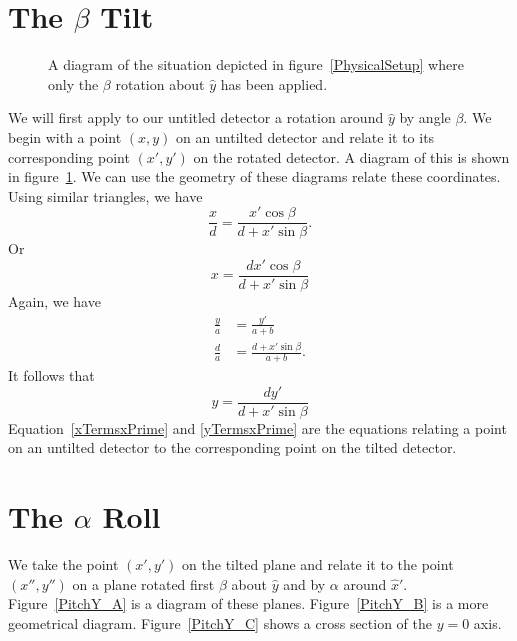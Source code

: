 \section{\texorpdfstring{The $\beta$ Tilt}{The beta Tilt}}

\begin{figure}[htb]
    \centering
    \subfloat[]{\label{PitchX_A}} 
    \hfill
    \subfloat[]{
    \label{PitchX_B}}
    \caption{A diagram of the situation depicted in 
    figure~\ref{PhysicalSetup} where only the 
    $\beta$ rotation about $\hat y$ has been applied.}
    \label{PitchX}
\end{figure}

We will first apply to our untitled detector a rotation 
around $\hat{y}$ by angle $\beta$.
We begin with a point $(x,y)$ on an
untilted detector and relate it to its corresponding point 
$(x',y')$ on the rotated detector.
A diagram of this is shown in figure~\ref{PitchX}.  
We can use the geometry of these diagrams 
relate these coordinates. Using
similar triangles, we have
\begin{equation}
    \frac{x}{d}=\frac{x'\cos\beta}{d+x'\sin\beta}.
\end{equation}
Or
\begin{equation}\label{xTermsxPrime}
    \boxed{x = \frac{dx'\cos\beta}{d+x'\sin\beta}}
\end{equation}
Again, we have
\begin{align}
    \frac{y}{a}&=\frac{y'}{a+b}\\
    \frac{d}{a}&=\frac{d+x'\sin\beta}{a+b}.
\end{align}
It follows that
\begin{equation}\label{yTermsxPrime}
	\boxed{y= \frac{dy'}{d+x'\sin\beta}}
\end{equation}
Equation~\ref{xTermsxPrime} and \ref{yTermsxPrime} are 
the equations relating a point on an
untilted detector to the corresponding point 
on the tilted detector.

\section{\texorpdfstring{The $\alpha$ Roll}{The alpha Roll}}

We take the point $(x',y')$ on the tilted 
plane and relate it to the point $(x'',y'')$ on a
plane rotated first $\beta$ about $\hat y$ and by
$\alpha$ around $\hat{x}'$. 
Figure~\ref{PitchY_A} is a diagram of these planes.
Figure~\ref{PitchY_B} is a more geometrical diagram.
Figure~\ref{PitchY_C} shows a cross section of the $y=0$
axis.

